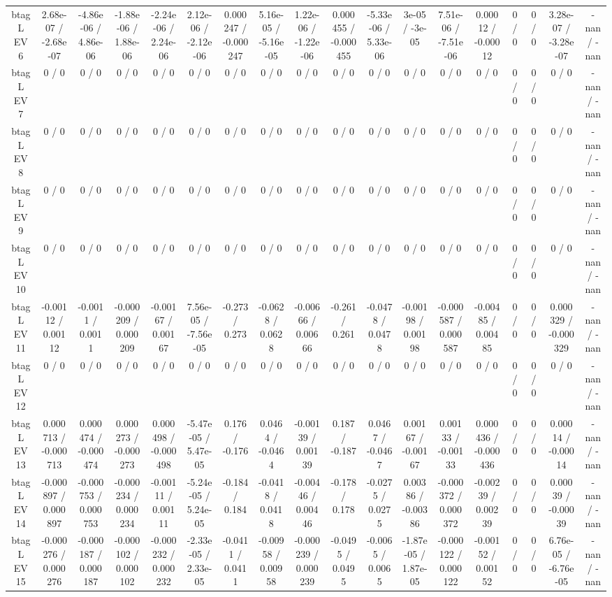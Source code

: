 \documentclass[10pt]{article}
\begin{document}
\begin{table}[htbp]
\begin{center}
\begin{tabular}{|c|c|c|c|c|c|c|c|c|c|c|c|c|c|c|c|c|c|}
  btag L EV 6 & 2.68e-07 / -2.68e-07 & -4.86e-06 / 4.86e-06 & -1.88e-06 / 1.88e-06 & -2.24e-06 / 2.24e-06 & 2.12e-06 / -2.12e-06 & 0.000247 / -0.000247 & 5.16e-05 / -5.16e-05 & 1.22e-06 / -1.22e-06 & 0.000455 / -0.000455 & -5.33e-06 / 5.33e-06 & 3e-05 / -3e-05 & 7.51e-06 / -7.51e-06 & 0.00012 / -0.00012 & 0 / 0 & 0 / 0 & 3.28e-07 / -3.28e-07 & -nan / -nan \\ 
  btag L EV 7 & 0 / 0 & 0 / 0 & 0 / 0 & 0 / 0 & 0 / 0 & 0 / 0 & 0 / 0 & 0 / 0 & 0 / 0 & 0 / 0 & 0 / 0 & 0 / 0 & 0 / 0 & 0 / 0 & 0 / 0 & 0 / 0 & -nan / -nan \\ 
  btag L EV 8 & 0 / 0 & 0 / 0 & 0 / 0 & 0 / 0 & 0 / 0 & 0 / 0 & 0 / 0 & 0 / 0 & 0 / 0 & 0 / 0 & 0 / 0 & 0 / 0 & 0 / 0 & 0 / 0 & 0 / 0 & 0 / 0 & -nan / -nan \\ 
  btag L EV 9 & 0 / 0 & 0 / 0 & 0 / 0 & 0 / 0 & 0 / 0 & 0 / 0 & 0 / 0 & 0 / 0 & 0 / 0 & 0 / 0 & 0 / 0 & 0 / 0 & 0 / 0 & 0 / 0 & 0 / 0 & 0 / 0 & -nan / -nan \\ 
  btag L EV 10 & 0 / 0 & 0 / 0 & 0 / 0 & 0 / 0 & 0 / 0 & 0 / 0 & 0 / 0 & 0 / 0 & 0 / 0 & 0 / 0 & 0 / 0 & 0 / 0 & 0 / 0 & 0 / 0 & 0 / 0 & 0 / 0 & -nan / -nan \\ 
  btag L EV 11 & -0.00112 / 0.00112 & -0.0011 / 0.0011 & -0.000209 / 0.000209 & -0.00167 / 0.00167 & 7.56e-05 / -7.56e-05 & -0.273 / 0.273 & -0.0628 / 0.0628 & -0.00666 / 0.00666 & -0.261 / 0.261 & -0.0478 / 0.0478 & -0.00198 / 0.00198 & -0.000587 / 0.000587 & -0.00485 / 0.00485 & 0 / 0 & 0 / 0 & 0.000329 / -0.000329 & -nan / -nan \\ 
  btag L EV 12 & 0 / 0 & 0 / 0 & 0 / 0 & 0 / 0 & 0 / 0 & 0 / 0 & 0 / 0 & 0 / 0 & 0 / 0 & 0 / 0 & 0 / 0 & 0 / 0 & 0 / 0 & 0 / 0 & 0 / 0 & 0 / 0 & -nan / -nan \\ 
  btag L EV 13 & 0.000713 / -0.000713 & 0.000474 / -0.000474 & 0.000273 / -0.000273 & 0.000498 / -0.000498 & -5.47e-05 / 5.47e-05 & 0.176 / -0.176 & 0.0464 / -0.0464 & -0.00139 / 0.00139 & 0.187 / -0.187 & 0.0467 / -0.0467 & 0.00167 / -0.00167 & 0.00133 / -0.00133 & 0.000436 / -0.000436 & 0 / 0 & 0 / 0 & 0.00014 / -0.00014 & -nan / -nan \\ 
  btag L EV 14 & -0.000897 / 0.000897 & -0.000753 / 0.000753 & -0.000234 / 0.000234 & -0.00111 / 0.00111 & -5.24e-05 / 5.24e-05 & -0.184 / 0.184 & -0.0418 / 0.0418 & -0.00446 / 0.00446 & -0.178 / 0.178 & -0.0275 / 0.0275 & 0.00386 / -0.00386 & -0.000372 / 0.000372 & -0.00239 / 0.00239 & 0 / 0 & 0 / 0 & 0.00039 / -0.00039 & -nan / -nan \\ 
  btag L EV 15 & -0.000276 / 0.000276 & -0.000187 / 0.000187 & -0.000102 / 0.000102 & -0.000232 / 0.000232 & -2.33e-05 / 2.33e-05 & -0.0411 / 0.0411 & -0.00958 / 0.00958 & -0.000239 / 0.000239 & -0.0495 / 0.0495 & -0.0065 / 0.0065 & -1.87e-05 / 1.87e-05 & -0.000122 / 0.000122 & -0.00152 / 0.00152 & 0 / 0 & 0 / 0 & 6.76e-05 / -6.76e-05 & -nan / -nan \\ 

\end{tabular}
\end{center}
\end{table}
\end{document}
